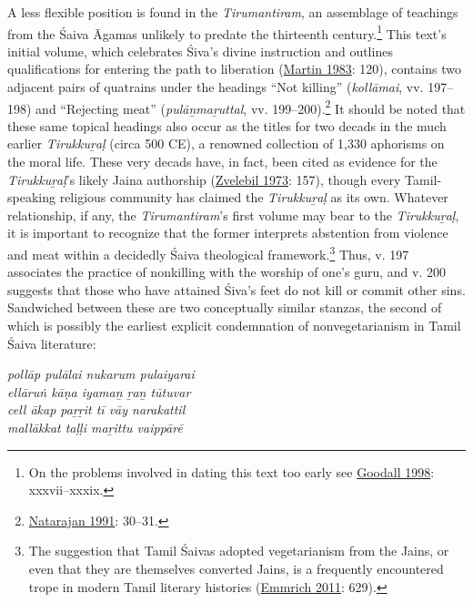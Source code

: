 A less flexible position is found in the \emph{{Tirumantiram}}, an assemblage of teachings from the Śaiva Āgamas unlikely to predate the thirteenth century.\footnote{%
On the problems involved in dating this text too early see \hyperref[Goodall1998]{Goodall 1998}:  xxxvii–xxxix.
}
 This text’s initial volume, which celebrates Śiva’s divine instruction and outlines qualifications for entering the path to liberation (\hyperref[Martin1983]{Martin 1983}: 120), contains two adjacent pairs of quatrains under the headings “Not killing” (\emph{kollāmai}, vv. 197–198) and “Rejecting meat” (\emph{pulāṉmaṟuttal}, vv. 199–200).\footnote{%
\hyperref[Natarajan1991]{Natarajan 1991}: 30–31. 
}
 It should be noted that these same topical headings also occur as the titles for two decads in the much earlier \emph{{Tirukkuṟaḷ}} (circa 500 CE), a renowned collection of 1,330 aphorisms on the moral life. These very decads have, in fact, been cited as evidence for the \emph{{Tirukkuṟaḷ}}’s likely Jaina authorship (\hyperref[Zvelebil1973]{Zvelebil 1973}: 157), though every Tamil-speaking religious community has claimed the \emph{{Tirukkuṟaḷ}} as its own. Whatever relationship, if any, the \emph{{Tirumantiram}}’s first volume may bear to the \emph{{Tirukkuṟaḷ}}, it is important to recognize that the former interprets abstention from violence and meat within a decidedly Śaiva theological framework.\footnote{%
The suggestion that Tamil Śaivas adopted vegetarianism from the Jains, or even that they are themselves converted Jains, is a frequently encountered trope in modern Tamil literary histories (\hyperref[Emmrich2011]{Emmrich 2011}: 629).
}
 Thus, v. 197 associates the practice of nonkilling with the worship of one’s guru, and v. 200 suggests that those who have attained Śiva’s feet do not kill or commit other sins. Sandwiched between these are two conceptually similar stanzas, the second of which is possibly the earliest explicit condemnation of nonvegetarianism in Tamil Śaiva literature:

\begin{pullquote}\raggedright
      \emph{pollāp pulālai nukarum pulaiyarai}\\
\emph{ellāruṅ kāṇa iyamaṉ ṟaṉ tūtuvar}\\
\emph{cell ākap paṟṟit tī vāy narakattil}\\
\emph{mallākkat taḷḷi maṟittu vaippārē}
\end{pullquote}
      
